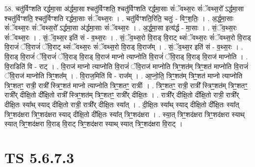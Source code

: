 \documentclass[17pt]{extarticle}
\begin{document}
58. चतु॑र्विꣳशति रर्द्धमा॒सा अ॑र्द्धमा॒सा श्चतु॑र्विꣳशति॒ श्चतु॑र्विꣳशति रर्द्धमा॒साः सं॑ॅवथ्स॒रः सं॑ॅवथ्स॒रो᳚ ऽर्द्धमा॒सा श्चतु॑र्विꣳशति॒ श्चतु॑र्विꣳशति रर्द्धमा॒साः सं॑ॅवथ्स॒रः । . चतु॑र्विꣳशति॒रिति॒ चतुः॑ - विꣳ॒॒श॒तिः॒ । . अ॒र्द्ध॒मा॒साः सं॑ॅवथ्स॒रः सं॑ॅवथ्स॒रो᳚ ऽर्द्धमा॒सा अ॑र्द्धमा॒साः सं॑ॅवथ्स॒रः । . अ॒र्द्ध॒मा॒सा इत्य॑र्द्ध - मा॒साः । . सं॒ॅव॒थ्स॒रः सं॑ॅवथ्स॒रः । . सं॒ॅव॒थ्स॒र इति॑ सं - व॒थ्स॒रः । . सं॒ॅव॒थ्स॒रो वि॒राड् वि॒राट् थ्सं॑ॅवथ्स॒रः सं॑ॅवथ्स॒रो वि॒राड् वि॒राजं॑ ॅवि॒राजं॑ ॅवि॒राट् 
थ्सं॑ॅवथ्स॒रः सं॑ॅवथ्स॒रो वि॒राड् वि॒राज᳚म् । . सं॒ॅव॒थ्स॒र इति॑ सं - व॒थ्स॒रः । . वि॒राड् वि॒राजं॑ ॅवि॒राजं॑ ॅवि॒राड् वि॒राड् वि॒राज॑ माप्नो त्याप्नोति वि॒राजं॑ ॅवि॒राड् वि॒राड् वि॒राज॑ माप्नोति । . वि॒राडिति॑ वि - राट् । . वि॒राज॑ माप्नो त्याप्नोति वि॒राजं॑ ॅवि॒राज॑ माप्नोति त्रिꣳ॒॒शत॑म् त्रिꣳ॒॒शत॑ माप्नोति वि॒राजं॑ ॅवि॒राज॑ माप्नोति त्रिꣳ॒॒शत᳚म् । . वि॒राज॒मिति॑ वि - राज᳚म् । . आ॒प्नो॒ति॒ त्रिꣳ॒॒शत॑म् त्रिꣳ॒॒शत॑ माप्नो त्याप्नोति त्रिꣳ॒॒शतꣳ॒॒ रात्री॒ रात्री᳚ स्त्रिꣳ॒॒शत॑ माप्नो त्याप्नोति त्रिꣳ॒॒शतꣳ॒॒ रात्रीः᳚ । . त्रिꣳ॒॒शतꣳ॒॒ रात्री॒ रात्री᳚ स्त्रिꣳ॒॒शत॑म् त्रिꣳ॒॒शतꣳ॒॒ रात्री᳚र् दीक्षि॒तो दी᳚क्षि॒तो रात्री᳚ स्त्रिꣳ॒॒शत॑म् त्रिꣳ॒॒शतꣳ॒॒ रात्री᳚र् दीक्षि॒तः । . रात्री᳚र् दीक्षि॒तो दी᳚क्षि॒तो रात्री॒ रात्री᳚र् दीक्षि॒तः स्या᳚थ् स्याद् दीक्षि॒तो रात्री॒ रात्री᳚र् दीक्षि॒तः स्या᳚त् । . दी॒क्षि॒तः स्या᳚थ् स्याद् दीक्षि॒तो दी᳚क्षि॒तः स्या᳚त् त्रिꣳ॒॒शद॑क्षरा त्रिꣳ॒॒शद॑क्षरा स्याद् दीक्षि॒तो दी᳚क्षि॒तः स्या᳚त् त्रिꣳ॒॒शद॑क्षरा । . स्या॒त् त्रिꣳ॒॒शद॑क्षरा त्रिꣳ॒॒शद॑क्षरा स्याथ् स्यात् त्रिꣳ॒॒शद॑क्षरा वि॒राड् वि॒राट् त्रिꣳ॒॒शद॑क्षरा स्याथ् स्यात् त्रिꣳ॒॒शद॑क्षरा वि॒राट् । \newline
\pagebreak
{}

\section{ TS 5.6.7.3 }
\end{document}
